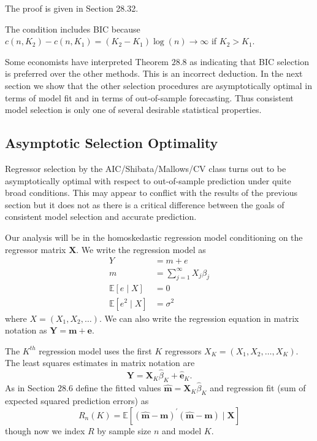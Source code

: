 \documentclass[10pt]{article}
\begin{document}
The proof is given in Section 28.32.

The condition includes BIC because $c\left(n, K_{2}\right)-c\left(n, K_{1}\right)=\left(K_{2}-K_{1}\right) \log (n) \rightarrow \infty$ if $K_{2}>K_{1}$.

Some economists have interpreted Theorem $28.8$ as indicating that BIC selection is preferred over the other methods. This is an incorrect deduction. In the next section we show that the other selection procedures are asymptotically optimal in terms of model fit and in terms of out-of-sample forecasting. Thus consistent model selection is only one of several desirable statistical properties.

\subsection{Asymptotic Selection Optimality}
Regressor selection by the AIC/Shibata/Mallows/CV class turns out to be asymptotically optimal with respect to out-of-sample prediction under quite broad conditions. This may appear to conflict with the results of the previous section but it does not as there is a critical difference between the goals of consistent model selection and accurate prediction.

Our analysis will be in the homoskedastic regression model conditioning on the regressor matrix $\boldsymbol{X}$. We write the regression model as
$$
\begin{aligned}
Y &=m+e \\
m &=\sum_{j=1}^{\infty} X_{j} \beta_{j} \\
\mathbb{E}[e \mid X] &=0 \\
\mathbb{E}\left[e^{2} \mid X\right] &=\sigma^{2}
\end{aligned}
$$
where $X=\left(X_{1}, X_{2}, \ldots\right)$. We can also write the regression equation in matrix notation as $\boldsymbol{Y}=\boldsymbol{m}+\boldsymbol{e}$.

The $K^{t h}$ regression model uses the first $K$ regressors $X_{K}=\left(X_{1}, X_{2}, \ldots, X_{K}\right)$. The least squares estimates in matrix notation are
$$
\boldsymbol{Y}=\boldsymbol{X}_{K} \widehat{\beta}_{K}+\widehat{\boldsymbol{e}}_{K} .
$$
As in Section $28.6$ define the fitted values $\widehat{\boldsymbol{m}}=\boldsymbol{X}_{K} \widehat{\beta}_{K}$ and regression fit (sum of expected squared prediction errors) as
$$
R_{n}(K)=\mathbb{E}\left[(\widehat{\boldsymbol{m}}-\boldsymbol{m})^{\prime}(\widehat{\boldsymbol{m}}-\boldsymbol{m}) \mid \boldsymbol{X}\right]
$$
though now we index $R$ by sample size $n$ and model $K$.
\end{document}
